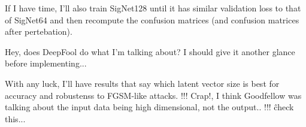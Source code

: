 If I have time, I'll also train SigNet128 until it has similar validation loss to that of SigNet64 and then recompute the confusion matrices (and confusion matrices after pertebation).

Hey, does DeepFool do what I'm talking about?
    I should give it another glance before implementing...

With any luck, I'll have results that say which latent vector size is best for accuracy and robustenss to FGSM-like attacks.
!!! Crap!, I think Goodfellow was talking about the input data being high dimensional, not the output.. !!!
    \^check this...
